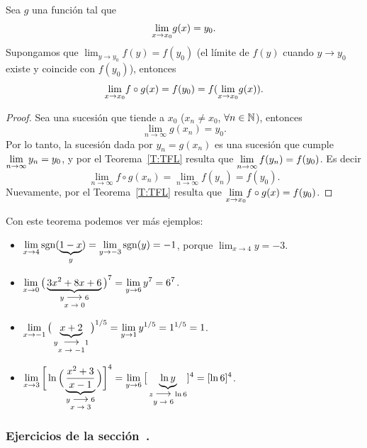 \begin{proposition}
    Sea $g$ una función %
    tal que
    \[
    {\lim_{x\to x_0}} g(x) = y_0.
    \]
    Supongamos que $\lim_{y\to y_0}f(y)=f(y_0)$ (el límite de $f(y)$ cuando $y\to y_0$ existe y coincide con $f(y_0)$), entonces
    \[
    {\lim_{x\to x_0}} f\circ g(x) = f(y_0) = f({\lim_{x\to x_0}} g(x)).
    \]
\end{proposition}

\begin{proof}
Sea \sucxn una sucesión que tiende a $x_0$ ($x_n\neq x_0$, $\forall {\ensuremath{n\in\mathbb{N}}}$), entonces 
\[
\lim_{n\to\infty} g(x_n) = y_0.
\]
Por lo tanto, la sucesión \sucyn dada por $y_n=g(x_n)$ es una sucesión que cumple $\displaystyle\lim_{n\to\infty}y_n=y_0$, 
y por el Teorema~\ref{T:TFL} resulta que $\displaystyle\lim_{n\to\infty}f(y_n)=f(y_0)$. Es decir
\[
\lim_{n\to\infty}f\circ g(x_n) = \lim_{n\to\infty}f(y_n)=f(y_0).
\]
Nuevamente, por el Teorema~\ref{T:TFL} resulta que $\displaystyle{\ensuremath{\lim_{x\to x_0}}} f\circ g(x) = f(y_0)$.
\end{proof}

\begin{example}
    Con este teorema podemos ver más ejemplos:
    \begin{itemize}
        \item $\displaystyle \lim_{x\to 4} \operatorname{sgn}(\underbrace{1-x}_{y})
        = \lim_{y\to -3} \operatorname{sgn}(y)=-1
        $,
        porque $\lim_{x\to4}y = -3$.
        \item $\D \lim_{x\to 0} \big(\underbrace{3x^2+8x+6}_{y\tox{0}6}\big)^7
        =\lim_{y\to 6} y^7 = 6^7
        $.
        \item $\D \lim_{x\to -1} \big(\underbrace{x+2}_{y\tox{-1}1}\big)^{1/5} 
        =\lim_{y\to 1} y^{1/5}=1^{1/5}=1
        $.
        \item $\D \lim_{x\to 3} \bigg[\ln\Big(\underbrace{\frac{x^2+3}{x-1}}_{y\tox{3}6}\Big)\bigg]^4
        =\lim_{y\to 6} \big[\underbrace{ \ln y}_{z\toy{6} \ln 6} ]^4
        = [\ln 6]^4
        $.
    \end{itemize}
\end{example}

\subsubsection*{Ejercicios de la sección~.}

\begin{enumerate}

\end{enumerate}


